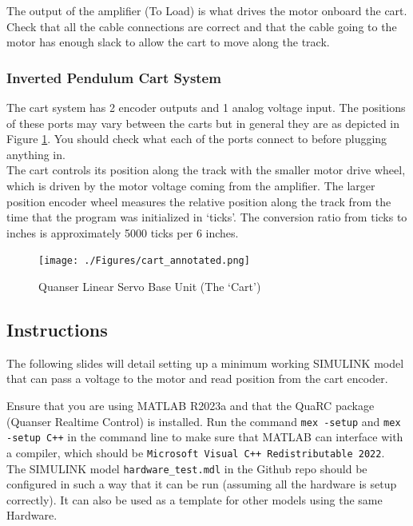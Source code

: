 \documentclass[11pt,letterpaper]{article}
\begin{document}
The output of the amplifier (To Load) is what drives the motor onboard the cart. Check that all the cable connections are correct and that the cable going to the motor has enough slack to allow the cart to move along the track. 

\subsubsection*{Inverted Pendulum Cart System}
The cart system has 2 encoder outputs and 1 analog voltage input. The positions of these ports may vary between the carts but in general they are as depicted in Figure \ref{fig:cart}. You should check what each of the ports connect to before plugging anything in. \\

The cart controls its position along the track with the smaller motor drive wheel, which is driven by the motor voltage coming from the amplifier. The larger position encoder wheel measures the relative position along the track from the time that the program was initialized in `ticks'. The conversion ratio from ticks to inches is approximately 5000 ticks per 6 inches.
\begin{figure}[H]
  \centering
  \texttt{[image: ./Figures/cart\_annotated.png]}
  \caption{Quanser Linear Servo Base Unit (The `Cart')}
  \label{fig:cart}
\end{figure}



\subsection*{Instructions}
The following slides will detail setting up a minimum working SIMULINK model that can pass a voltage to the motor and read position from the cart encoder.

Ensure that you are using MATLAB R2023a and that the QuaRC package (Quanser Realtime Control) is installed. Run the command \texttt{mex -setup} and \texttt{mex -setup C++} in the command line to make sure that MATLAB can interface with a compiler, which should be \texttt{Microsoft Visual C++ Redistributable 2022}. \\

The SIMULINK model \texttt{hardware\_test.mdl} in the Github repo should be configured in such a way that it can be run (assuming all the hardware is setup correctly). It can also be used as a template for other models using the same Hardware.
\end{document}
